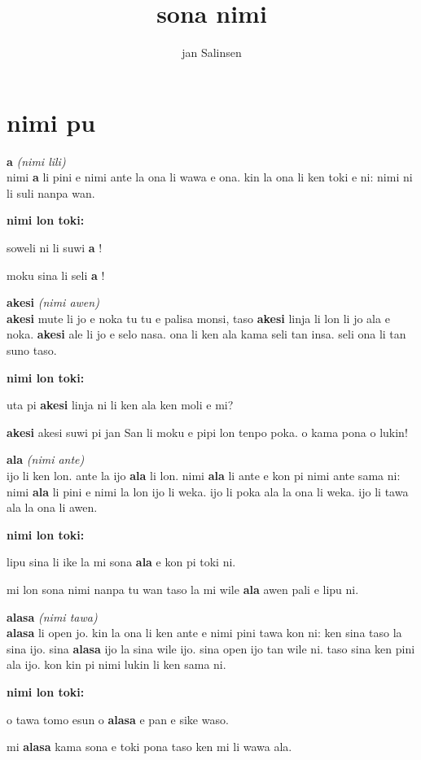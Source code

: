 \documentclass[a4paper,11pt]{book}
\title{sona nimi}
\author{jan Salinsen}
\newenvironment{definition}[2]{ %
  \begin{description}
  \item
    {\huge \textbf{#1}}
    {\Large \textit{(#2)}} \\
}{
  \end{description}%
}
\newenvironment{example}{ %
  \item
  \textbf{nimi lon toki:}
  
  \hfill
  \begin{minipage}{\dimexpr\textwidth-1cm}
  \begin{itshape}
}
{
  \end{itshape}
  \end{minipage}
}
\newcommand{\inex}[1]{%
  \textbf{#1}%
}
\begin{document}
\maketitle
\tableofcontents

\chapter{nimi pu}

\begin{definition}{a}{nimi lili}
  nimi \inex{a} li pini e nimi ante la ona li wawa e ona. kin la ona li ken toki e ni: nimi ni li suli nanpa wan.
  \begin{example}
    soweli ni li suwi \inex{a}!
    
    moku sina li seli \inex{a}!
  \end{example}
\end{definition}

\begin{definition}{akesi}{nimi awen}
  \inex{akesi} mute li jo e noka tu tu e palisa monsi, taso \inex{akesi} linja li lon li jo ala e noka. \inex{akesi} ale li jo e selo nasa. ona li ken ala kama seli tan insa. seli ona li tan suno taso.
  \begin{example}
    uta pi \inex{akesi} linja ni li ken ala ken moli e mi?
    
    \inex{akesi} akesi suwi pi jan San li moku e pipi lon tenpo poka. o kama pona o lukin!
  \end{example}
\end{definition}

\begin{definition}{ala}{nimi ante}
  ijo li ken lon. ante la ijo \inex{ala} li lon. nimi \inex{ala} li ante e kon pi nimi ante sama ni: nimi \inex{ala} li pini e nimi la lon ijo li weka. ijo li poka ala la ona li weka. ijo li tawa ala la ona li awen.
  \begin{example}
    lipu sina li ike la mi sona \inex{ala} e kon pi toki ni.
    
    mi lon sona nimi nanpa tu wan taso la mi wile \inex{ala} awen pali e lipu ni.
  \end{example}
\end{definition}

\pagebreak

\begin{definition}{alasa}{nimi tawa}
  \inex{alasa} li open jo. kin la ona li ken ante e nimi pini tawa kon ni: ken sina taso la sina ijo. sina \inex{alasa} ijo la sina wile ijo. sina open ijo tan wile ni. taso sina ken pini ala ijo. kon kin pi nimi lukin li ken sama ni.
  \begin{example}
    o tawa tomo esun o \inex{alasa} e pan e sike waso.
    
    mi \inex{alasa} kama sona e toki pona taso ken mi li wawa ala.
  \end{example}
\end{definition}
\end{document}

